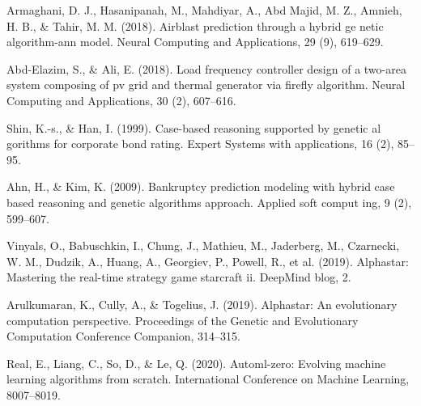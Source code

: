 \documentclass[12pt, a4paper, oneside]{ctexart}
\numberwithin{equation}{section}  %
\begin{document}
\begin{thebibliography}{99}
Armaghani, D. J., Hasanipanah, M., Mahdiyar, A., Abd Majid, M. Z., Amnieh,
H. B., \& Tahir, M. M. (2018). Airblast prediction through a hybrid ge
netic algorithm-ann model. Neural Computing and Applications, 29 (9),
619–629.

Abd-Elazim, S., \& Ali, E. (2018). Load frequency controller design of a two-area
system composing of pv grid and thermal generator via firefly algorithm.
Neural Computing and Applications, 30 (2), 607–616.

Shin, K.-s., \& Han, I. (1999). Case-based reasoning supported by genetic al
gorithms for corporate bond rating. Expert Systems with applications,
16 (2), 85–95.

Ahn, H., \& Kim, K. (2009). Bankruptcy prediction modeling with hybrid case
based reasoning and genetic algorithms approach. Applied soft comput
ing, 9 (2), 599–607.

Vinyals, O., Babuschkin, I., Chung, J., Mathieu, M., Jaderberg, M., Czarnecki,
W. M., Dudzik, A., Huang, A., Georgiev, P., Powell, R., et al. (2019).
Alphastar: Mastering the real-time strategy game starcraft ii. DeepMind
blog, 2.

Arulkumaran, K., Cully, A., \& Togelius, J. (2019). Alphastar: An evolutionary
computation perspective. Proceedings of the Genetic and Evolutionary
Computation Conference Companion, 314–315.

Real, E., Liang, C., So, D., \& Le, Q. (2020). Automl-zero: Evolving machine
learning algorithms from scratch. International Conference on Machine
Learning, 8007–8019.

\end{thebibliography}
\end{document}
